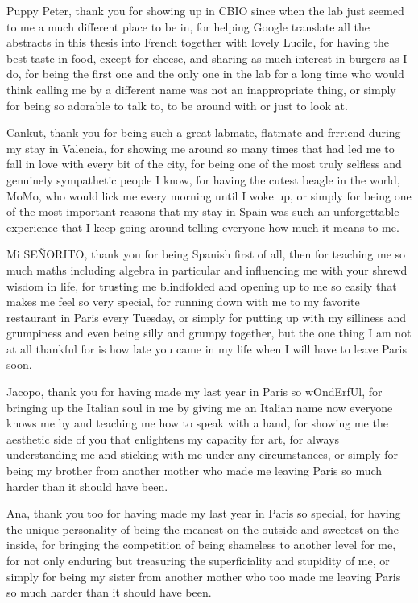 Puppy Peter, thank you for showing up in CBIO since when the lab just seemed to me a much different place to be in, for helping Google translate all the abstracts in this thesis into French together with lovely Lucile, for having the best taste in food, except for cheese, and sharing as much interest in burgers as I do, for being the first one and the only one in the lab for a long time who would think calling me by a different name was not an inappropriate thing, or simply for being so adorable to talk to, to be around with or just to look at.


Cankut, thank you for being such a great labmate, flatmate and frrriend during my stay in Valencia, for showing me around so many times that had led me to fall in love with every bit of the city, for being one of the most truly selfless and genuinely sympathetic people I know, for having the cutest beagle in the world, MoMo, who would lick me every morning until I woke up, or simply for being one of the most important reasons that my stay in Spain was such an unforgettable experience that I keep going around telling everyone how much it means to me.


Mi SE\~{N}ORITO, thank you for being Spanish first of all, then for teaching me so much maths including algebra in particular and influencing me with your shrewd wisdom in life, for trusting me blindfolded and opening up to me so easily that makes me feel so very special, for running down with me to my favorite restaurant in Paris every Tuesday, or simply for putting up with my silliness and grumpiness and even being silly and grumpy together, but the one thing I am not at all thankful for is how late you came in my life when I will have to leave Paris soon.


Jacopo, thank you for having made my last year in Paris so wOndErfUl, for bringing up the Italian soul in me by giving me an Italian name now everyone knows me by and teaching me how to speak with a hand, for showing me the aesthetic side of you that enlightens my capacity for art, for always understanding me and sticking with me under any circumstances, or simply for being my brother from another mother who made me leaving Paris so much harder than it should have been.


Ana, thank you too for having made my last year in Paris so special, for having the unique personality of being the meanest on the outside and sweetest on the inside, for bringing the competition of being shameless to another level for me, for not only enduring but treasuring the superficiality and stupidity of me, or simply for being my sister from another mother who too made me leaving Paris so much harder than it should have been.


